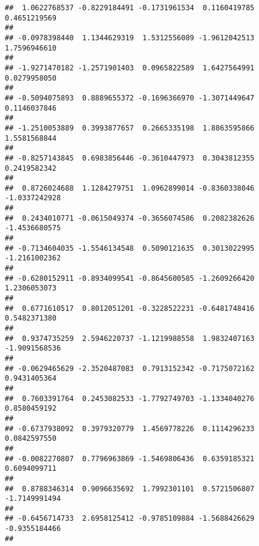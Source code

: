 \documentclass[]{article}
\begin{document}
\begin{verbatim}
##  1.0622768537 -0.8229184491 -0.1731961534  0.1160419785  0.4651219569 
##                                                                       
## -0.0978398440  1.1344629319  1.5312556089 -1.9612042513  1.7596946610 
##                                                                       
## -1.9271470182 -1.2571901403  0.0965822589  1.6427564991  0.0279958050 
##                                                                       
## -0.5094075893  0.8889655372 -0.1696366970 -1.3071449647  0.1146037846 
##                                                                       
## -1.2510053889  0.3993877657  0.2665335198  1.8863595866  1.5581568844 
##                                                                       
## -0.8257143845  0.6983856446 -0.3610447973  0.3043812355  0.2419582342 
##                                                                       
##  0.8726024688  1.1284279751  1.0962899014 -0.8360338046 -1.0337242928 
##                                                                       
##  0.2434010771 -0.0615049374 -0.3656074586  0.2082382626 -1.4536680575 
##                                                                       
## -0.7134604035 -1.5546134548  0.5090121635  0.3013022995 -1.2161002362 
##                                                                       
## -0.6280152911 -0.8934099541 -0.8645600585 -1.2609266420  1.2306053073 
##                                                                       
##  0.6771610517  0.8012051201 -0.3228522231 -0.6481748416  0.5482371380 
##                                                                       
##  0.9374735259  2.5946220737 -1.1219988558  1.9832407163 -1.9091568536 
##                                                                       
## -0.0629465629 -2.3520487083  0.7913152342 -0.7175072162  0.9431405364 
##                                                                       
##  0.7603391764  0.2453082533 -1.7792749703 -1.1334040276  0.8580459192 
##                                                                       
## -0.6737938092  0.3979320779  1.4569778226  0.1114296233  0.0842597550 
##                                                                       
## -0.0082270807  0.7796963869 -1.5469806436  0.6359185321  0.6094099711 
##                                                                       
##  0.8788346314  0.9096635692  1.7992301101  0.5721506807 -1.7149991494 
##                                                                       
## -0.6456714733  2.6958125412 -0.9785109884 -1.5688426629 -0.9355184466 
##                                                                       

\end{verbatim}
\end{document}
